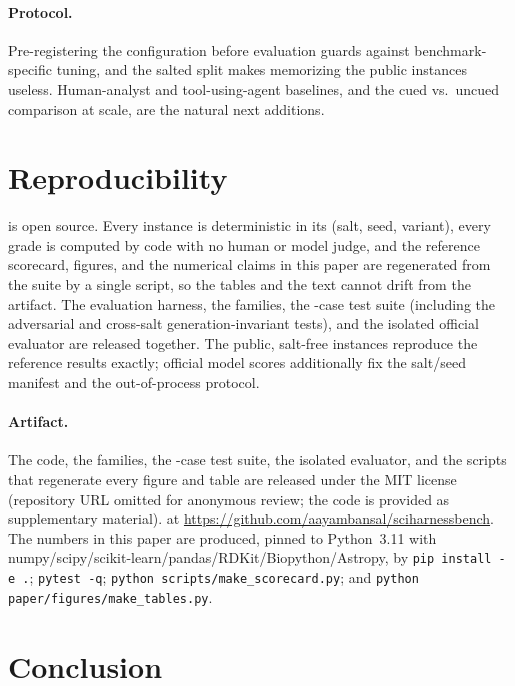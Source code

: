 \documentclass[letterpaper]{article} %
\begin{document}
\paragraph{Protocol.}
Pre-registering the configuration before evaluation guards against
benchmark-specific tuning, and the salted split makes memorizing the public
instances useless. Human-analyst and tool-using-agent baselines, and the cued vs.\
uncued comparison at scale, are the natural next additions.

\section{Reproducibility}

\bench is open source. Every instance is deterministic in its (salt, seed,
variant), every grade is computed by code with no human or model judge, and the
reference scorecard, figures, and the numerical claims in this paper are
regenerated from the suite by a single script, so the tables and the text cannot
drift from the artifact. The evaluation harness, the \NumFamilies families, the
\NumTests-case test suite (including the adversarial and cross-salt
generation-invariant tests), and the isolated official evaluator are released
together. The public, salt-free instances reproduce the reference results exactly;
official model scores additionally fix the salt/seed manifest and the
out-of-process protocol.

\paragraph{Artifact.}
The code, the \NumFamilies families, the \NumTests-case test suite, the isolated
evaluator, and the scripts that regenerate every figure and table are released
under the MIT license
\ifdefined\aaaianonymous
(repository URL omitted for anonymous review; the code is provided as
supplementary material).
\else
at \url{https://github.com/aayambansal/sciharnessbench}.
\fi
The numbers in this paper are produced, pinned to Python~3.11 with
numpy/scipy/scikit-learn/pandas/RDKit/Biopython/Astropy, by \texttt{pip install -e
.}; \texttt{pytest -q}; \texttt{python scripts/make\_scorecard.py}; and
\texttt{python paper/figures/make\_tables.py}.

\section{Conclusion}
\end{document}
